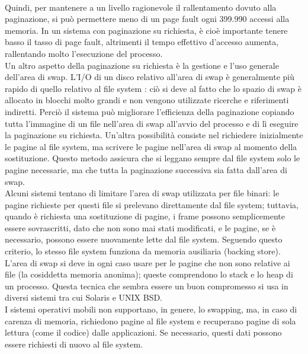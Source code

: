 \documentclass{article}
\begin{document}
				\\Quindi, per mantenere a un livello ragionevole il rallentamento dovuto alla paginazione, si può permettere meno di un page fault ogni 399.990 accessi alla memoria. In un sistema con paginazione su richiesta, è cioè importante tenere basso il tasso di page fault, altrimenti il tempo effettivo d’accesso aumenta, rallentando molto l’esecuzione del processo.
				\\Un altro aspetto della paginazione su richiesta è la gestione e l’uso generale dell’area di swap. L’I/O di un disco relativo all’area di swap è generalmente più rapido di quello relativo al file system : ciò si deve al fatto che lo spazio di swap è allocato in blocchi molto grandi e non vengono utilizzate ricerche e riferimenti indiretti. Perciò il sistema può migliorare l’efficienza della paginazione copiando tutta
				l’immagine di un file nell’area di swap all’avvio del processo e di lì eseguire la paginazione su richiesta. Un’altra possibilità consiste nel richiedere inizialmente le pagine al file system, ma scrivere le pagine nell’area di swap al momento della sostituzione. Questo metodo assicura che si leggano sempre dal file system solo le pagine necessarie, ma che tutta la paginazione successiva sia fatta dall’area di swap.
				\\Alcuni sistemi tentano di limitare l’area di swap utilizzata per file binari: le pagine richieste per questi file si prelevano direttamente dal file system; tuttavia, quando è richiesta una sostituzione di pagine, i frame possono semplicemente essere sovrascritti, dato che non sono mai stati modificati, e le pagine, se è necessario, possono
				essere nuovamente lette dal file system. Seguendo questo criterio, lo stesso file system funziona da memoria ausiliaria (backing store). L’area di swap si deve in ogni caso usare per le pagine che non sono relative ai file (la cosiddetta memoria anonima); queste comprendono lo stack e lo heap di un processo. Questa tecnica che sembra essere un buon compromesso si usa in diversi sistemi tra cui Solaris e UNIX BSD.
				\\I sistemi operativi mobili non supportano, in genere, lo swapping, ma, in caso di carenza di memoria, richiedono pagine al file system e recuperano pagine di sola lettura (come il codice) dalle applicazioni. Se necessario, questi dati possono essere richiesti di nuovo al file system.
			
\end{document}
